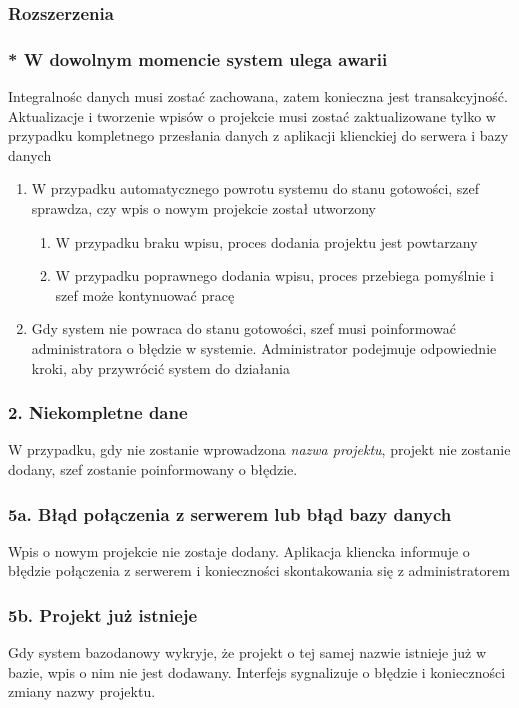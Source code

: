 \documentclass{article}
\begin{document}
\subsubsection*{Rozszerzenia}

\subsubsection*{* W dowolnym momencie system ulega awarii}
Integralnośc danych musi zostać zachowana, zatem konieczna jest transakcyjność. Aktualizacje
i tworzenie wpisów o projekcie musi zostać zaktualizowane tylko w przypadku kompletnego przesłania
danych z aplikacji klienckiej do serwera i bazy danych
\begin{enumerate}
    \item W przypadku automatycznego powrotu systemu do stanu gotowości, szef sprawdza, czy wpis o nowym projekcie został utworzony
          \begin{enumerate}
              \item W przypadku braku wpisu, proces dodania projektu jest powtarzany
              \item W przypadku poprawnego dodania wpisu, proces przebiega pomyślnie i szef może kontynuować pracę
          \end{enumerate}
    \item Gdy system nie powraca do stanu gotowości, szef musi poinformować administratora o błędzie w systemie. Administrator podejmuje odpowiednie kroki, aby przywrócić system do działania
\end{enumerate}

\subsubsection*{2. Niekompletne dane}
W przypadku, gdy nie zostanie wprowadzona \textit{nazwa projektu}, projekt nie zostanie dodany, szef zostanie poinformowany o błędzie.

\subsubsection*{5a. Błąd połączenia z serwerem lub błąd bazy danych}
Wpis o nowym projekcie nie zostaje dodany. Aplikacja kliencka informuje o błędzie połączenia z serwerem i konieczności skontakowania się z administratorem


\subsubsection*{5b. Projekt już istnieje}
Gdy system bazodanowy wykryje, że projekt o tej samej nazwie istnieje już w bazie, wpis o nim nie jest dodawany. Interfejs sygnalizuje o błędzie i konieczności zmiany nazwy projektu.
\end{document}
